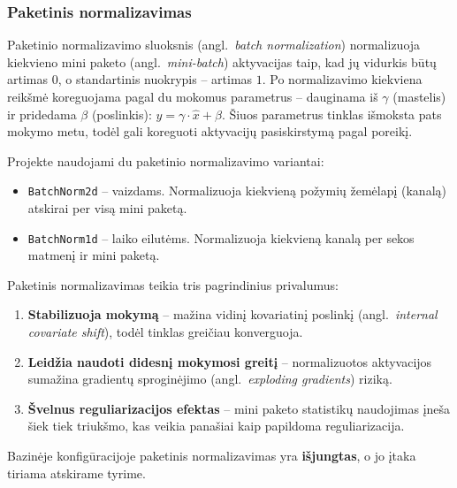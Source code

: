 \subsubsection{Paketinis normalizavimas}
\label{subsubsec:paketinis_normalizavimas}

Paketinio normalizavimo sluoksnis (angl.~\textit{batch normalization}) normalizuoja kiekvieno mini paketo (angl.~\textit{mini-batch}) aktyvacijas taip, kad jų vidurkis būtų artimas $0$, o standartinis nuokrypis – artimas $1$. Po normalizavimo kiekviena reikšmė koreguojama pagal du mokomus parametrus – dauginama iš $\gamma$ (mastelis) ir pridedama $\beta$ (poslinkis): $y = \gamma \cdot \hat{x} + \beta$. Šiuos parametrus tinklas išmoksta pats mokymo metu, todėl gali koreguoti aktyvacijų pasiskirstymą pagal poreikį.

Projekte naudojami du paketinio normalizavimo variantai:
\begin{itemize}
    \item \texttt{BatchNorm2d} – vaizdams. Normalizuoja kiekvieną požymių žemėlapį (kanalą) atskirai per visą mini paketą.
    \item \texttt{BatchNorm1d} – laiko eilutėms. Normalizuoja kiekvieną kanalą per sekos matmenį ir mini paketą.
\end{itemize}

Paketinis normalizavimas teikia tris pagrindinius privalumus:
\begin{enumerate}
    \item \textbf{Stabilizuoja mokymą} – mažina vidinį kovariatinį poslinkį (angl.~\textit{internal covariate shift}), todėl tinklas greičiau konverguoja.
    \item \textbf{Leidžia naudoti didesnį mokymosi greitį} – normalizuotos aktyvacijos sumažina gradientų sproginėjimo (angl.~\textit{exploding gradients}) riziką.
    \item \textbf{Švelnus reguliarizacijos efektas} – mini paketo statistikų naudojimas įneša šiek tiek triukšmo, kas veikia panašiai kaip papildoma reguliarizacija.
\end{enumerate}

Bazinėje konfigūracijoje paketinis normalizavimas yra \textbf{išjungtas}, o jo įtaka tiriama atskirame tyrime.
